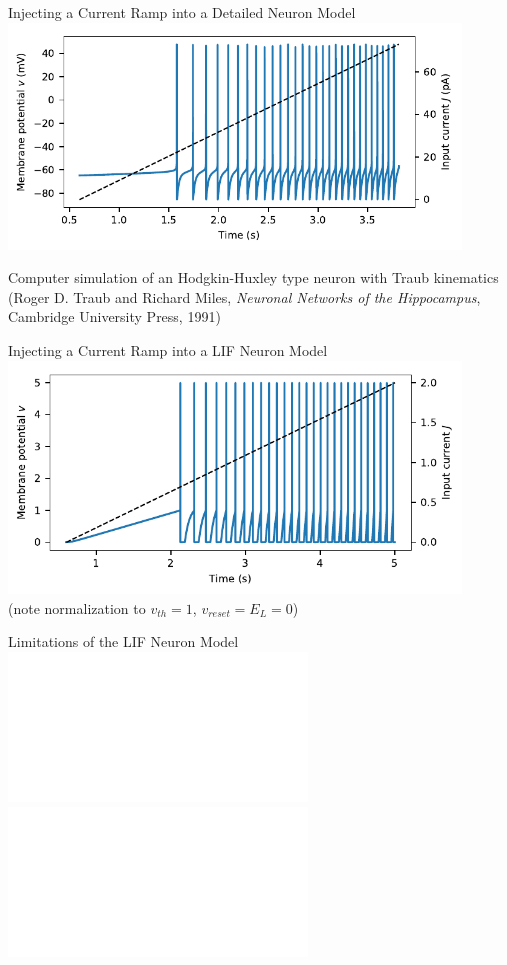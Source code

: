 \documentclass[handout,aspectratio=169]{beamer}
\begin{document}
\begin{frame}{Injecting a Current Ramp into a Detailed Neuron Model}
	\centering
	\includegraphics[width=0.9\textwidth]{media/hh_neuron_ramp.pdf}

	\begin{overlayarea}{\textwidth}{1cm}
		\centering
		{\tiny\color{aluminium4} Computer simulation of an Hodgkin-Huxley type neuron with Traub kinematics (Roger D. Traub and Richard Miles, \emph{Neuronal Networks of the Hippocampus},
			Cambridge University Press, 1991)}
	\end{overlayarea}
\end{frame}

\begin{frame}{Injecting a Current Ramp into a LIF Neuron Model}
	\centering
	\includegraphics[width=0.9\textwidth]{media/lif_neuron_ramp.pdf} \\
	(note normalization to $v_{th}=1$, $v_{reset}=E_L=0$)

	\begin{overlayarea}{\textwidth}{1cm}
	\end{overlayarea}
\end{frame}

\begin{frame}{Limitations of the LIF Neuron Model}
	\centering
	\includegraphics<1>[width=\textwidth]{media/izhikevich_whichmod_figure1.pdf}
	\includegraphics<2>[width=\textwidth]{media/izhikevich_whichmod_figure2.pdf}
\end{frame}
\end{document}
